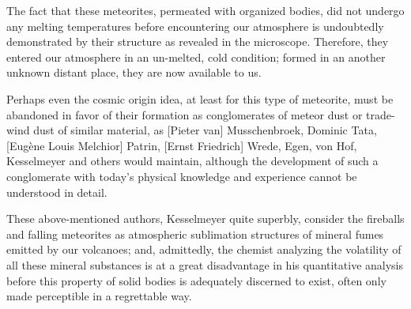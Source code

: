 \documentclass[a4paper, 12pt, oneside]{article}
\begin{document}
The fact that these meteorites, permeated with organized bodies, did not undergo any melting temperatures before encountering our atmosphere is undoubtedly demonstrated by their structure as revealed in the microscope. Therefore, they entered our atmosphere in an un-melted, cold condition; formed in an another unknown distant place, they are now available to us.

Perhaps even the cosmic origin idea, at least for this type of meteorite, must be abandoned in favor of their formation as conglomerates of meteor dust or trade-wind dust of similar material, as [Pieter van] Musschenbroek, Dominic Tata, [Eugène Louis Melchior] Patrin, [Ernst Friedrich] Wrede, Egen, von Hof, Kesselmeyer and others would maintain, although the development of such a conglomerate with today's physical knowledge and experience cannot be understood in detail.

These above-mentioned authors, Kesselmeyer quite superbly, consider the fireballs and falling meteorites as atmospheric sublimation structures of mineral fumes emitted by our volcanoes; and, admittedly, the chemist analyzing the volatility of all these mineral substances is at a great disadvantage in his quantitative analysis before this property of solid bodies is adequately discerned to exist, often only made perceptible in a regrettable way.
\end{document}
